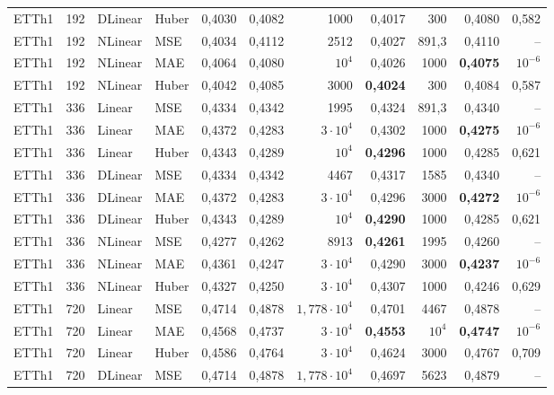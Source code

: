 {\begin{longtable}{@{}lrll rr rr rr r@{}}
ETTh1 & 192 & DLinear & Huber & 0{,}4030 & 0{,}4082 & 1000 & 0{,}4017 & 300 & 0{,}4080 & 0{,}582 \\
\addlinespace[2pt]
ETTh1 & 192 & NLinear & MSE & 0{,}4034 & 0{,}4112 & 2512 & 0{,}4027 & 891{,}3 & 0{,}4110 & -- \\
ETTh1 & 192 & NLinear & MAE & 0{,}4064 & 0{,}4080 & $10^{4}$ & 0{,}4026 & 1000 & \textbf{0{,}4075} & $10^{-6}$ \\
ETTh1 & 192 & NLinear & Huber & 0{,}4042 & 0{,}4085 & 3000 & \textbf{0{,}4024} & 300 & 0{,}4084 & 0{,}587 \\
\addlinespace[2pt]
ETTh1 & 336 & Linear & MSE & 0{,}4334 & 0{,}4342 & 1995 & 0{,}4324 & 891{,}3 & 0{,}4340 & -- \\
ETTh1 & 336 & Linear & MAE & 0{,}4372 & 0{,}4283 & $3\cdot 10^{4}$ & 0{,}4302 & 1000 & \textbf{0{,}4275} & $10^{-6}$ \\
ETTh1 & 336 & Linear & Huber & 0{,}4343 & 0{,}4289 & $10^{4}$ & \textbf{0{,}4296} & 1000 & 0{,}4285 & 0{,}621 \\
\addlinespace[2pt]
ETTh1 & 336 & DLinear & MSE & 0{,}4334 & 0{,}4342 & 4467 & 0{,}4317 & 1585 & 0{,}4340 & -- \\
ETTh1 & 336 & DLinear & MAE & 0{,}4372 & 0{,}4283 & $3\cdot 10^{4}$ & 0{,}4296 & 3000 & \textbf{0{,}4272} & $10^{-6}$ \\
ETTh1 & 336 & DLinear & Huber & 0{,}4343 & 0{,}4289 & $10^{4}$ & \textbf{0{,}4290} & 1000 & 0{,}4285 & 0{,}621 \\
\addlinespace[2pt]
ETTh1 & 336 & NLinear & MSE & 0{,}4277 & 0{,}4262 & 8913 & \textbf{0{,}4261} & 1995 & 0{,}4260 & -- \\
ETTh1 & 336 & NLinear & MAE & 0{,}4361 & 0{,}4247 & $3\cdot 10^{4}$ & 0{,}4290 & 3000 & \textbf{0{,}4237} & $10^{-6}$ \\
ETTh1 & 336 & NLinear & Huber & 0{,}4327 & 0{,}4250 & $3\cdot 10^{4}$ & 0{,}4307 & 1000 & 0{,}4246 & 0{,}629 \\
\addlinespace[2pt]
ETTh1 & 720 & Linear & MSE & 0{,}4714 & 0{,}4878 & $1{,}778\cdot 10^{4}$ & 0{,}4701 & 4467 & 0{,}4878 & -- \\
ETTh1 & 720 & Linear & MAE & 0{,}4568 & 0{,}4737 & $3\cdot 10^{4}$ & \textbf{0{,}4553} & $10^{4}$ & \textbf{0{,}4747} & $10^{-6}$ \\
ETTh1 & 720 & Linear & Huber & 0{,}4586 & 0{,}4764 & $3\cdot 10^{4}$ & 0{,}4624 & 3000 & 0{,}4767 & 0{,}709 \\
\addlinespace[2pt]
ETTh1 & 720 & DLinear & MSE & 0{,}4714 & 0{,}4878 & $1{,}778\cdot 10^{4}$ & 0{,}4697 & 5623 & 0{,}4879 & -- \\

\end{longtable}}
